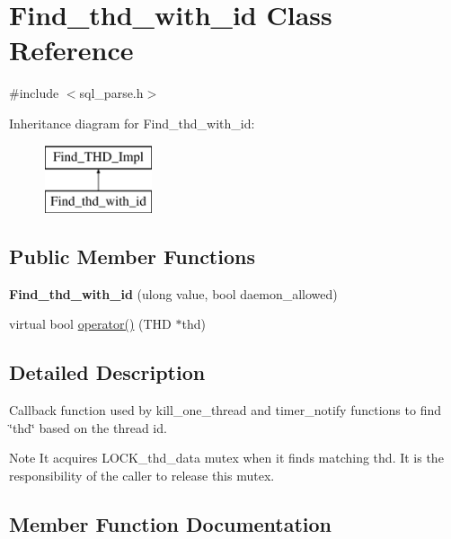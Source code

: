 \hypertarget{classFind__thd__with__id}{}\section{Find\+\_\+thd\+\_\+with\+\_\+id Class Reference}
\label{classFind__thd__with__id}


{\ttfamily \#include $<$sql\+\_\+parse.\+h$>$}

Inheritance diagram for Find\+\_\+thd\+\_\+with\+\_\+id\+:\begin{figure}[H]
\begin{center}
\leavevmode
\includegraphics[height=2.000000cm]{classFind__thd__with__id}
\end{center}
\end{figure}
\subsection*{Public Member Functions}
\begin{DoxyCompactItemize}
\item 
\mbox{\label{classFind__thd__with__id_a0ca2f24d86d25001f1272a097fe81367}} 
{\bfseries Find\+\_\+thd\+\_\+with\+\_\+id} (ulong value, bool daemon\+\_\+allowed)
\item 
virtual bool \mbox{\hyperlink{classFind__thd__with__id_a0a1d128b4bb4ca839a1814e0737c5d0d}{operator()}} (T\+HD $\ast$thd)
\end{DoxyCompactItemize}


\subsection{Detailed Description}
Callback function used by kill\+\_\+one\+\_\+thread and timer\+\_\+notify functions to find \char`\"{}thd\char`\"{} based on the thread id.

\begin{DoxyNote}{Note}
It acquires L\+O\+C\+K\+\_\+thd\+\_\+data mutex when it finds matching thd. It is the responsibility of the caller to release this mutex. 
\end{DoxyNote}


\subsection{Member Function Documentation}
\mbox{\label{classFind__thd__with__id_a0a1d128b4bb4ca839a1814e0737c5d0d}} 
